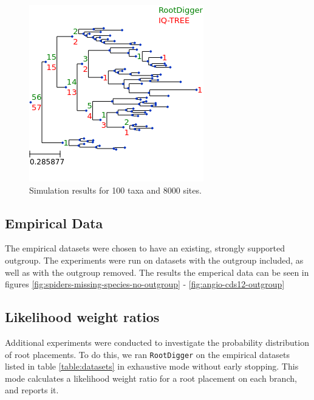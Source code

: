 \documentclass{article}
\newcommand{\RootDiggertt}{\texttt{RootDigger}}
\begin{document}
\begin{figure}
  \includegraphics{figs/sim_results/50_8000.png}
  \caption{Simulation results for 100 taxa and 8000
  sites. \label{fig:sim-results-50t-8000s}}
\end{figure}

\subsection{Empirical Data}

The empirical datasets were chosen to have an existing, strongly supported
outgroup.
The experiments were run on datasets with the outgroup included, as well as
with the outgroup removed. The results the emperical data can be seen in figures
\ref{fig:spiders-missing-species-no-outgroup} - \ref{fig:angio-cds12-outgroup}

\begin{table}[H]
  \begin{center}
    
    \label{table:datasets}
  \end{center}
\end{table}

%    

\subsection{Likelihood weight ratios}

Additional experiments were conducted to investigate the probability
distribution of root placements.
To do this, we ran \RootDiggertt{} on the empirical datasets listed in table
\ref{table:datasets} in exhaustive mode without early stopping.
This mode calculates a likelihood weight ratio for a root placement on each
branch, and reports it.
\end{document}
